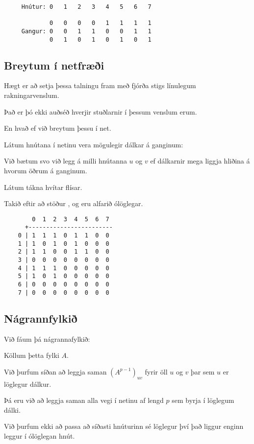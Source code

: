 { \begin{verbatim}
     Hnútur: 0   1   2   3   4   5   6   7

             0   0   0   0   1   1   1   1
     Gangur: 0   0   1   1   0   0   1   1
             0   1   0   1   0   1   0   1
\end{verbatim}}
\subsection{Breytum í netfræði}
{
    {
        \item<1-> Hægt er að setja þessa talningu fram með fjórða stigs línulegum rakningarvenslum.
        \item<2-> Það er þó ekki auðséð hverjir stuðlarnir í þessum venslum erum.
        \item<3-> En hvað ef við breytum þessu í net.
        \item<4-> Látum hnútana í netinu vera mögulegir dálkar á ganginum:
        \item<5->[] \gangar
        \item<6-> Við bætum svo við legg á milli hnútanna $u$ og $v$ ef dálkarnir mega liggja hliðina á hvorum öðrum á ganginum.
        \item<7-> Látum  tákna hvítar flísar.
        \item<8-> Takið eftir að stöður ,  og  eru alfarið ólöglegar.
    }
}

{ \begin{verbatim}
        0  1  2  3  4  5  6  7
      +------------------------
    0 | 1  1  1  0  1  1  0  0
    1 | 1  0  1  0  1  0  0  0
    2 | 1  1  0  0  1  1  0  0
    3 | 0  0  0  0  0  0  0  0
    4 | 1  1  1  0  0  0  0  0
    5 | 1  0  1  0  0  0  0  0
    6 | 0  0  0  0  0  0  0  0
    7 | 0  0  0  0  0  0  0  0
\end{verbatim}}
\subsection{Nágrannfylkið}
{
    {
        \item<1-> Við fáum þá nágrannafylkið:
        \item<2->[] \gangarfylki
        \item<3-> Köllum þetta fylki $A$.
        \item<4-> Við þurfum síðan að leggja saman $(A^{p - 1})_{uv}$ fyrir öll $u$ og $v$ þar sem $u$ er löglegur dálkur.
        \item<5-> Þá eru við að leggja saman alla vegi í netinu af lengd $p$ sem byrja í löglegum dálki.
        \item<6-> Við þurfum ekki að passa að síðasti hnúturinn sé löglegur því það liggur enginn leggur í ólöglegan hnút.
    }
}


